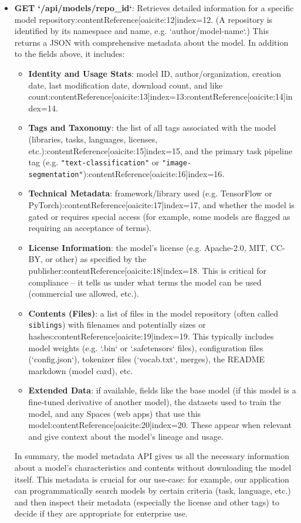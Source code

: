\documentclass{article}
\begin{document}
\begin{itemize}
    \item \textbf{GET `/api/models/{repo\_id}`}: Retrieves detailed information for a specific model repository:contentReference[oaicite:12]{index=12}. (A repository is identified by its namespace and name, e.g. `author/model-name`.) This returns a JSON with comprehensive metadata about the model. In addition to the fields above, it includes:
    \begin{itemize}
        \item \textbf{Identity and Usage Stats}: model ID, author/organization, creation date, last modification date, download count, and like count:contentReference[oaicite:13]{index=13}:contentReference[oaicite:14]{index=14}.
        \item \textbf{Tags and Taxonomy}: the list of all tags associated with the model (libraries, tasks, languages, licenses, etc.):contentReference[oaicite:15]{index=15}, and the primary task pipeline tag (e.g. \texttt{"text-classification"} or \texttt{"image-segmentation"}):contentReference[oaicite:16]{index=16}.
        \item \textbf{Technical Metadata}: framework/library used (e.g. TensorFlow or PyTorch):contentReference[oaicite:17]{index=17}, and whether the model is gated or requires special access (for example, some models are flagged as requiring an acceptance of terms).
        \item \textbf{License Information}: the model’s license (e.g. Apache-2.0, MIT, CC-BY, or other) as specified by the publisher:contentReference[oaicite:18]{index=18}. This is critical for compliance – it tells us under what terms the model can be used (commercial use allowed, etc.).
        \item \textbf{Contents (Files)}: a list of files in the model repository (often called \texttt{siblings}) with filenames and potentially sizes or hashes:contentReference[oaicite:19]{index=19}. This typically includes model weights (e.g. `.bin` or `.safetensors` files), configuration files (`config.json`), tokenizer files (`vocab.txt`, merges), the README markdown (model card), etc.
        \item \textbf{Extended Data}: if available, fields like the base model (if this model is a fine-tuned derivative of another model), the datasets used to train the model, and any Spaces (web apps) that use this model:contentReference[oaicite:20]{index=20}. These appear when relevant and give context about the model’s lineage and usage.
    \end{itemize}
    In summary, the model metadata API gives us all the necessary information about a model’s characteristics and contents without downloading the model itself. This metadata is crucial for our use-case: for example, our application can programmatically search models by certain criteria (task, language, etc.) and then inspect their metadata (especially the license and other tags) to decide if they are appropriate for enterprise use.
\end{itemize}
\end{document}
